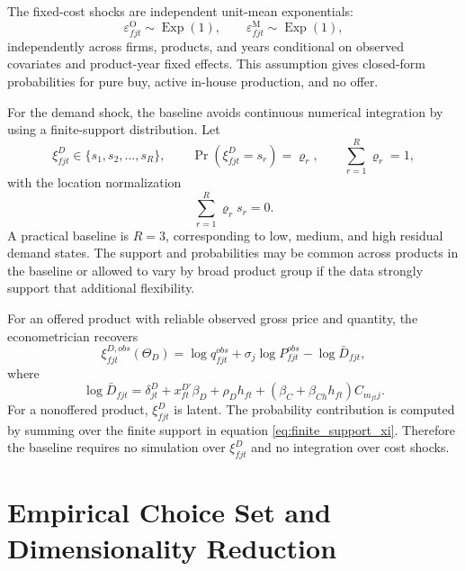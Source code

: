 \documentclass[11pt,a4paper]{article}
\newcommand{\M}{\mathrm{M}}
\newcommand{\OFC}{\mathrm{O}}
\begin{document}
The fixed-cost shocks are independent unit-mean exponentials:
\begin{equation}
    \varepsilon^{\OFC}_{fjt}\sim\operatorname{Exp}(1),
    \qquad
    \varepsilon^{\M}_{fjt}\sim\operatorname{Exp}(1),
    \label{eq:fixed_exp_assumption}
\end{equation}
independently across firms, products, and years conditional on observed covariates and product-year fixed effects. This assumption gives closed-form probabilities for pure buy, active in-house production, and no offer.

For the demand shock, the baseline avoids continuous numerical integration by using a finite-support distribution. Let
\begin{equation}
    \xi^D_{fjt}\in\{s_1,s_2,\ldots,s_R\},
    \qquad
    \Pr(\xi^D_{fjt}=s_r)=\varrho_r,
    \qquad
    \sum_{r=1}^R\varrho_r=1,
    \label{eq:finite_support_xi}
\end{equation}
with the location normalization
\begin{equation}
    \sum_{r=1}^R\varrho_r s_r=0.
    \label{eq:xi_normalization}
\end{equation}
A practical baseline is $R=3$, corresponding to low, medium, and high residual demand states. The support and probabilities may be common across products in the baseline or allowed to vary by broad product group if the data strongly support that additional flexibility.

For an offered product with reliable observed gross price and quantity, the econometrician recovers
\begin{equation}
    \xi^{D,obs}_{fjt}(\Theta_D)
    =\log q^{obs}_{fjt}+\sigma_j\log P^{obs}_{fjt}
    -\log \bar D_{fjt},
    \label{eq:xi_observed}
\end{equation}
where
\begin{equation}
    \log \bar D_{fjt}
    =\delta^D_{jt}
    +x^{D\prime}_{ft}\beta_D
    +\rho_D h_{ft}
    +\left(\beta_C+\beta_{Ch}h_{ft}\right)C_{m_{ft}j}.
    \label{eq:Dbar}
\end{equation}
For a nonoffered product, $\xi^D_{fjt}$ is latent. The probability contribution is computed by summing over the finite support in equation \eqref{eq:finite_support_xi}. Therefore the baseline requires no simulation over $\xi^D_{fjt}$ and no integration over cost shocks.

\section{Empirical Choice Set and Dimensionality Reduction}
\label{sec:choice_set}
\end{document}
